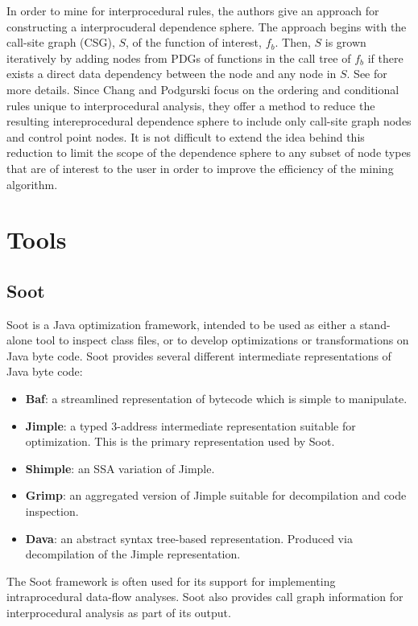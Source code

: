 \documentclass[12pt]{article}
\begin{document}
In order to mine for interprocedural rules, the authors give an approach for constructing a interprocuderal dependence sphere. The approach begins with the call-site graph (CSG), $S$, of the function of interest, $f_b$. Then, $S$ is grown iteratively by adding nodes from PDGs of functions in the call tree of $f_b$ if there exists a direct data dependency between the node and any node in $S$. See \cite{DBLP:journals/smr/ChangP12} for more details. Since Chang and Podgurski focus on the ordering and conditional rules unique to interprocedural analysis, they offer a method to reduce the resulting intereprocedural dependence sphere to include only call-site graph nodes and control point nodes. It is not difficult to extend the idea behind this reduction to limit the scope of the dependence sphere to any subset of node types that are of interest to the user in order to improve the efficiency of the mining algorithm.

\section{Tools}
\label{section:Tools and Data Sources}
\subsection{Soot}
Soot is a Java optimization framework, intended to be used as either a stand-alone tool to inspect class files, or to develop optimizations or transformations on Java byte code. Soot provides several different intermediate representations of Java byte code: 

\begin{itemize}
    \item\textbf{Baf}: a streamlined representation of bytecode which is simple to manipulate.
    \item\textbf{Jimple}: a typed 3-address intermediate representation suitable for optimization. This is the primary representation used by Soot.
    \item\textbf{Shimple}: an SSA variation of Jimple.
    \item\textbf{Grimp}: an aggregated version of Jimple suitable for decompilation and code inspection.
    \item\textbf{Dava}: an abstract syntax tree-based representation. Produced via decompilation of the Jimple representation.
\end{itemize}
The Soot framework is often used for its support for implementing intraprocedural data-flow analyses. Soot also provides call graph information for interprocedural analysis as part of its output. 
\end{document}
